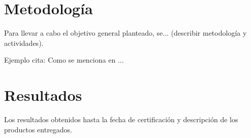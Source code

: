 \documentclass[10pt,table,xcdraw]{article}
\begin{document}
	\section{Metodología}
	Para llevar a cabo el objetivo general planteado, se... (describir metodología y actividades).
	
	Ejemplo cita: Como se menciona en \cite{wang2018multi}...
	
	\section{Resultados}
	Los resultados obtenidos hasta la fecha de certificación y descripción de los productos entregados.
	
	
	
	
\end{document}
